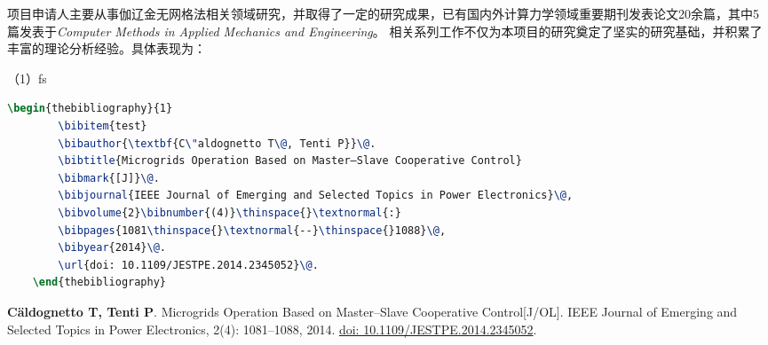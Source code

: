

项目申请人主要从事伽辽金无网格法相关领域研究，并取得了一定的研究成果，已有国内外计算力学领域重要期刊发表论文20余篇，其中5篇发表于\textit{Computer Methods in Applied Mechanics and Engineering}。
相关系列工作不仅为本项目的研究奠定了坚实的研究基础，并积累了丰富的理论分析经验。具体表现为：

（1）fs

\begin{lstlisting}[language=tex, basicstyle=\ttfamily\tiny, keywordstyle=\color{blue}, commentstyle=\color{gray}]
	\begin{thebibliography}{1}
		\bibitem{test}
		\bibauthor{\textbf{C\"aldognetto T\@, Tenti P}}\@. 
		\bibtitle{Microgrids Operation Based on Master–Slave Cooperative Control}
		\bibmark{[J]}\@.
		\bibjournal{IEEE Journal of Emerging and Selected Topics in Power Electronics}\@,
		\bibvolume{2}\bibnumber{(4)}\thinspace{}\textnormal{:}
		\bibpages{1081\thinspace{}\textnormal{--}\thinspace{}1088}\@,
		\bibyear{2014}\@.
		\url{doi: 10.1109/JESTPE.2014.2345052}\@.
	\end{thebibliography}
\end{lstlisting}

\vspace{-50pt}
\begin{thebibliography}{1}
	\providecommand{\bibauthor}[1]{#1}
	\providecommand{\bibeditor}[1]{#1}
	\providecommand{\bibtranslator}[1]{#1}
	\providecommand{\bibtitle}[1]{#1}
	\providecommand{\bibbooktitle}[1]{#1}
	\providecommand{\bibjournal}[1]{#1}
	\providecommand{\bibmark}[1]{#1}
	\providecommand{\bibcountry}[1]{#1}
	\providecommand{\bibpatentid}[1]{#1}
	\providecommand{\bibedition}[1]{#1}
	\providecommand{\biborganization}[1]{#1}
	\providecommand{\bibaddress}[1]{#1}
	\providecommand{\bibpublisher}[1]{#1}
	\providecommand{\bibinstitution}[1]{#1}
	\providecommand{\bibschool}[1]{#1}
	\providecommand{\bibvolume}[1]{#1}
	\providecommand{\bibnumber}[1]{#1}
	\providecommand{\bibversion}[1]{#1}
	\providecommand{\bibpages}[1]{#1}
	\providecommand{\bibmodifydate}[1]{#1}
	\providecommand{\bibcitedate}[1]{#1}
	\providecommand{\bibyear}[1]{#1}
	\providecommand{\bibdate}[1]{#1}
	\providecommand{\biburl}[1]{\newline\url{#1}}
	\bibauthor{\textbf{C\"aldognetto T\@, Tenti P}}\@. \bibtitle{Microgrids Operation Based
		on Master–Slave Cooperative Control}\bibmark{[J/OL]}\@. \bibjournal{IEEE
		Journal of Emerging and Selected Topics in Power Electronics}\@,
	\bibvolume{2}\bibnumber{(4)}\thinspace{}\textnormal{:
	}\bibpages{1081\thinspace{}\textnormal{--}\thinspace{}1088}\@,
	\bibyear{2014}\@. \url{doi: 10.1109/JESTPE.2014.2345052}\@.
\end{thebibliography}